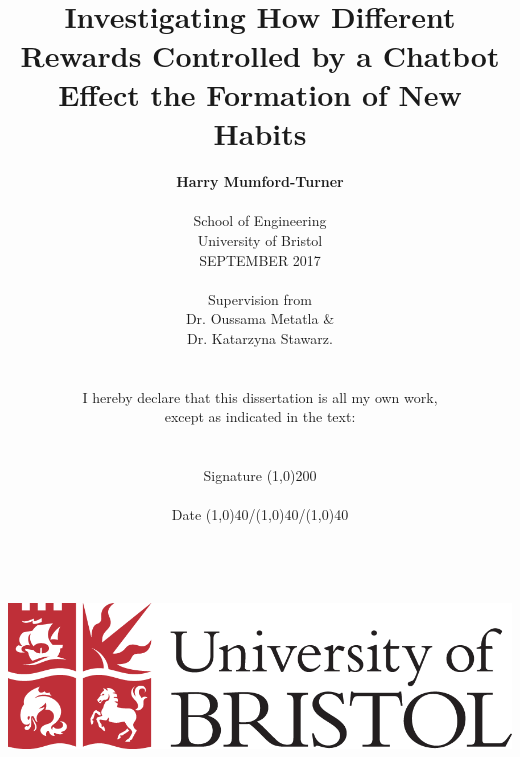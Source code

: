 

\date{} %

\title{\huge{\textbf{\\\\\\Investigating How Different Rewards Controlled by a Chatbot Effect the Formation of New Habits}}}
\author{\textbf{Harry Mumford-Turner}\\
\\
School of Engineering\\
University of Bristol\\
SEPTEMBER 2017\\
\\
Supervision from\\
Dr. Oussama Metatla \&\\Dr. Katarzyna Stawarz.
\\
\\\\
I hereby declare that this dissertation is all my own work,\\
except as indicated in the text:\\
\\
\\
Signature \line(1,0){200}\\
\\
Date \line(1,0){40}/\line(1,0){40}/\line(1,0){40}\\
\\
\\
\\
\\
\includegraphics[scale=0.29]{resources/UoB-logo.png}}

